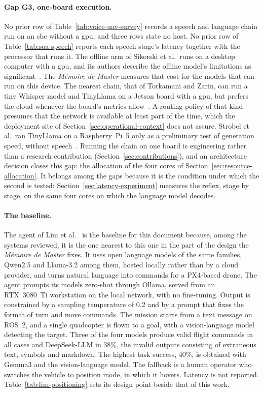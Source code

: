 \paragraph{Gap G3, one-board execution.} No prior row of Table~\ref{tab:voice-uav-survey} records
a speech and language chain run on an \gls{sbc} without a \gls{gpu}, and three rows state no host.
No prior row of Table~\ref{tab:soa-speech} reports each speech stage's latency together with the
processor that runs it. The offline arm of Sikorski et al.\ runs on a desktop computer with a
\gls{gpu}, and its authors describe the offline model's limitations as
significant~\cite{sikorski2025}. The \emph{M\'emoire de Master} measures that cost for the models
that can run on this device. The nearest chain, that of Torkamani and Zarin, can run a tiny Whisper
model and TinyLlama on a Jetson board with a \gls{gpu}, but prefers the cloud whenever the board's
metrics allow~\cite{torkamani2025}. A routing policy of that kind presumes that the network is
available at least part of the time, which the deployment site of
Section~\ref{sec:operational-context} does not assure. Strobel et al.\ ran TinyLlama on a
Raspberry~Pi~5 only as a preliminary test of generation speed, without speech~\cite{llm2swarm2024}.
Running the chain on one board is engineering rather than a research contribution
(Section~\ref{sec:contributions}), and an architecture decision closes this gap: the allocation of
the four cores of Section~\ref{sec:resource-allocation}. It belongs among the gaps because it is the
condition under which the second is tested: Section~\ref{sec:latency-experiment} measures the
reflex, stage by stage, on the same four cores on which the language model decodes.

\paragraph{The baseline.} The agent of Lim et al.~\cite{lim2025} is the baseline for this document
because, among the systems reviewed, it is the one nearest to this one in the part of the design the
\emph{M\'emoire de Master} fixes. It uses open language models of the same families, Qwen2.5 and
Llama-3.2 among them, hosted locally rather than by a cloud provider, and turns natural language
into commands for a PX4-based drone. The agent prompts its models zero-shot through Ollama, served
from an RTX~3080~Ti workstation on the local network, with no fine-tuning. Output is constrained by
a sampling temperature of 0.2 and by a prompt that fixes the format of turn and move commands. The
mission starts from a text message on ROS~2, and a single quadcopter is flown to a goal, with a
vision-language model detecting the target. Three of the four models produce valid flight commands
in all cases and DeepSeek-LLM in 38\%, the invalid outputs consisting of extraneous text, symbols
and markdown. The highest task success, 40\%, is obtained with Gemma3 and the vision-language model.
The fallback is a human operator who switches the vehicle to position mode, in which it hovers.
Latency is not reported. Table~\ref{tab:lim-positioning} sets its design point beside that of this
work.


